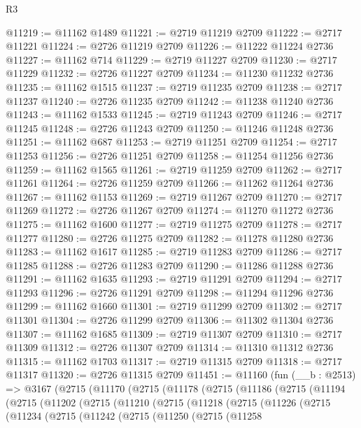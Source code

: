 \begin{lexlean}{R3}
\begin{coremodule}
@11219 := @11162 @1489
@11221 := @2719 @11219 @2709
@11222 := @2717 @11221
@11224 := @2726 @11219 @2709
@11226 := @11222 @11224 @2736
@11227 := @11162 @714
@11229 := @2719 @11227 @2709
@11230 := @2717 @11229
@11232 := @2726 @11227 @2709
@11234 := @11230 @11232 @2736
@11235 := @11162 @1515
@11237 := @2719 @11235 @2709
@11238 := @2717 @11237
@11240 := @2726 @11235 @2709
@11242 := @11238 @11240 @2736
@11243 := @11162 @1533
@11245 := @2719 @11243 @2709
@11246 := @2717 @11245
@11248 := @2726 @11243 @2709
@11250 := @11246 @11248 @2736
@11251 := @11162 @687
@11253 := @2719 @11251 @2709
@11254 := @2717 @11253
@11256 := @2726 @11251 @2709
@11258 := @11254 @11256 @2736
@11259 := @11162 @1565
@11261 := @2719 @11259 @2709
@11262 := @2717 @11261
@11264 := @2726 @11259 @2709
@11266 := @11262 @11264 @2736
@11267 := @11162 @1153
@11269 := @2719 @11267 @2709
@11270 := @2717 @11269
@11272 := @2726 @11267 @2709
@11274 := @11270 @11272 @2736
@11275 := @11162 @1600
@11277 := @2719 @11275 @2709
@11278 := @2717 @11277
@11280 := @2726 @11275 @2709
@11282 := @11278 @11280 @2736
@11283 := @11162 @1617
@11285 := @2719 @11283 @2709
@11286 := @2717 @11285
@11288 := @2726 @11283 @2709
@11290 := @11286 @11288 @2736
@11291 := @11162 @1635
@11293 := @2719 @11291 @2709
@11294 := @2717 @11293
@11296 := @2726 @11291 @2709
@11298 := @11294 @11296 @2736
@11299 := @11162 @1660
@11301 := @2719 @11299 @2709
@11302 := @2717 @11301
@11304 := @2726 @11299 @2709
@11306 := @11302 @11304 @2736
@11307 := @11162 @1685
@11309 := @2719 @11307 @2709
@11310 := @2717 @11309
@11312 := @2726 @11307 @2709
@11314 := @11310 @11312 @2736
@11315 := @11162 @1703
@11317 := @2719 @11315 @2709
@11318 := @2717 @11317
@11320 := @2726 @11315 @2709
@11451 := @11160
    (fun (__b : @2513) =>
    @3167
      (@2715
        (@11170
          (@2715
            (@11178
              (@2715
                (@11186
                  (@2715
                    (@11194
                      (@2715
                        (@11202
                          (@2715
                            (@11210
                              (@2715
                                (@11218
                                  (@2715
                                    (@11226
                                      (@2715
                                        (@11234
                                          (@2715
                                            (@11242
                                              (@2715
                                                (@11250
                                                  (@2715
                                                    (@11258

\end{coremodule}
\end{lexlean}
